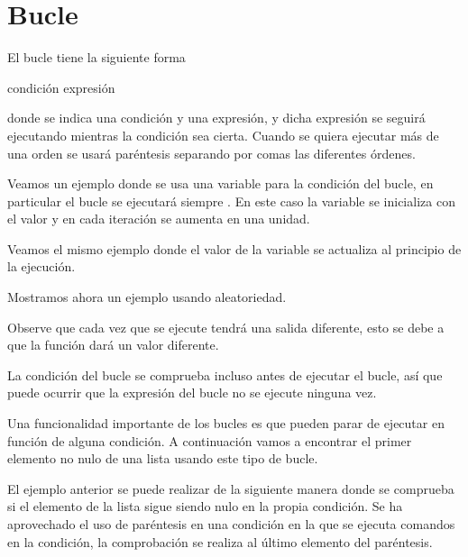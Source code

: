 
\section{Bucle }

El bucle  tiene la siguiente forma
\begin{center}
	 condición  expresión
\end{center}
donde se indica una condición y una expresión,
y dicha expresión se seguirá ejecutando mientras la
condición sea cierta. Cuando se quiera ejecutar más
de una orden se usará paréntesis separando por comas
las diferentes órdenes.

Veamos un ejemplo donde se usa una variable 
para la condición del bucle, en particular el bucle se ejecutará
siempre . En este caso la variable 
se inicializa con el valor  y en cada iteración
se aumenta en una unidad.

Veamos el mismo ejemplo donde el valor de la variable
 se actualiza al principio de la ejecución.



Mostramos ahora un ejemplo usando aleatoriedad.



Observe que cada vez que se ejecute tendrá una
salida diferente, esto se debe a que la función
 dará un valor diferente.



La condición del bucle se comprueba incluso antes de ejecutar
el bucle, así que puede ocurrir que la expresión del bucle no
se ejecute ninguna vez.



Una funcionalidad importante de los bucles 
es que pueden parar de ejecutar en función de alguna condición.
A continuación vamos a encontrar el primer elemento no nulo
de una lista usando este tipo de bucle.



El ejemplo anterior se puede realizar de la siguiente manera
donde se comprueba si el elemento de la lista sigue siendo
nulo en la propia condición. Se ha aprovechado el uso de paréntesis
en una condición en la que se ejecuta comandos en la condición,
la comprobación se realiza al último elemento del paréntesis.

